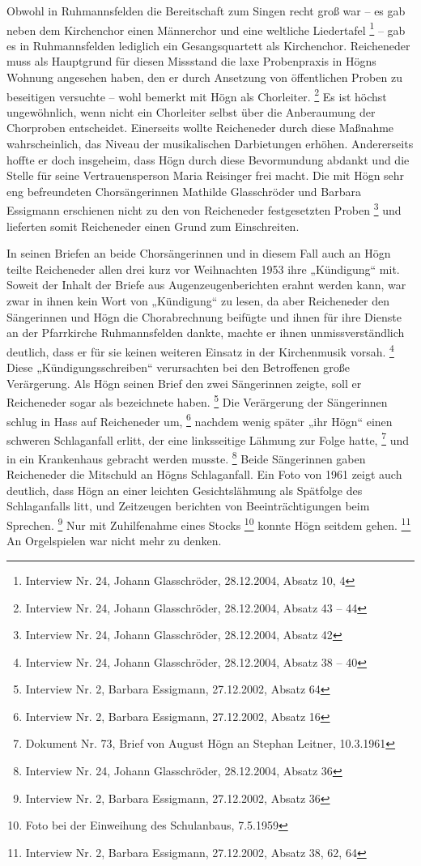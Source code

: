 Obwohl in Ruhmannsfelden die Bereitschaft zum Singen recht groß war – es
gab neben dem Kirchenchor einen Männerchor und eine weltliche
Liedertafel \footnote{Interview Nr. 24, Johann Glasschröder,
28.12.2004, Absatz 10, 4 } – gab es in Ruhmannsfelden lediglich ein
Gesangsquartett als Kirchenchor. Reicheneder muss als Hauptgrund für
diesen Missstand die laxe Probenpraxis in Högns Wohnung angesehen
haben, den er durch Ansetzung von öffentlichen Proben zu beseitigen
versuchte – wohl bemerkt mit Högn als Chorleiter. \footnote{Interview
Nr. 24, Johann Glasschröder, 28.12.2004, Absatz 43 – 44} Es ist höchst
ungewöhnlich, wenn nicht ein Chorleiter selbst über die Anberaumung der
Chorproben entscheidet. Einerseits wollte Reicheneder durch diese
Maßnahme wahrscheinlich, das Niveau der musikalischen Darbietungen
erhöhen. Andererseits hoffte er doch insgeheim, dass Högn durch diese
Bevormundung abdankt und die Stelle für seine Vertrauensperson Maria
Reisinger frei macht. Die mit Högn sehr eng befreundeten
Chorsängerinnen Mathilde Glasschröder und Barbara Essigmann erschienen
nicht zu den von Reicheneder festgesetzten Proben \footnote{Interview
Nr. 24, Johann Glasschröder, 28.12.2004, Absatz 42} und lieferten somit
Reicheneder einen Grund zum Einschreiten.

In seinen Briefen an beide Chorsängerinnen und in diesem Fall auch an
Högn teilte Reicheneder allen drei kurz vor Weihnachten 1953 ihre
„Kündigung“ mit. Soweit der Inhalt der Briefe aus Augenzeugenberichten
erahnt werden kann, war zwar in ihnen kein Wort von „Kündigung“ zu
lesen, da aber Reicheneder den Sängerinnen und Högn die Chorabrechnung
beifügte und ihnen für ihre Dienste an der Pfarrkirche Ruhmannsfelden
dankte, machte er ihnen unmissverständlich deutlich, dass er für sie
keinen weiteren Einsatz in der Kirchenmusik vorsah. \footnote{Interview
Nr. 24, Johann Glasschröder, 28.12.2004, Absatz 38 – 40} Diese
„Kündigungsschreiben“ verursachten bei den Betroffenen große
Verärgerung. Als Högn seinen Brief den zwei Sängerinnen zeigte, soll er
Reicheneder sogar als  bezeichnete
haben. \footnote{Interview Nr. 2, Barbara Essigmann, 27.12.2002, Absatz
64} Die Verärgerung der Sängerinnen schlug in Hass auf Reicheneder
um, \footnote{Interview Nr. 2, Barbara Essigmann, 27.12.2002, Absatz
16} nachdem wenig später „ihr Högn“ einen schweren Schlaganfall erlitt,
der eine linksseitige Lähmung zur Folge hatte, \footnote{Dokument Nr.
73, Brief von August Högn an Stephan Leitner, 10.3.1961} und in ein
Krankenhaus gebracht werden musste. \footnote{Interview Nr. 24, Johann
Glasschröder, 28.12.2004, Absatz 36} Beide Sängerinnen gaben
Reicheneder die Mitschuld an Högns Schlaganfall. Ein Foto von 1961
zeigt auch deutlich, dass Högn an einer leichten Gesichtslähmung als
Spätfolge des Schlaganfalls litt, und Zeitzeugen berichten von
Beeinträchtigungen beim Sprechen. \footnote{Interview Nr. 2, Barbara
Essigmann, 27.12.2002, Absatz 36} Nur mit Zuhilfenahme eines
Stocks \footnote{Foto bei der Einweihung des Schulanbaus, 7.5.1959}
konnte Högn seitdem gehen. \footnote{Interview Nr. 2, Barbara
Essigmann, 27.12.2002, Absatz 38, 62, 64} An Orgelspielen war nicht
mehr zu denken.


